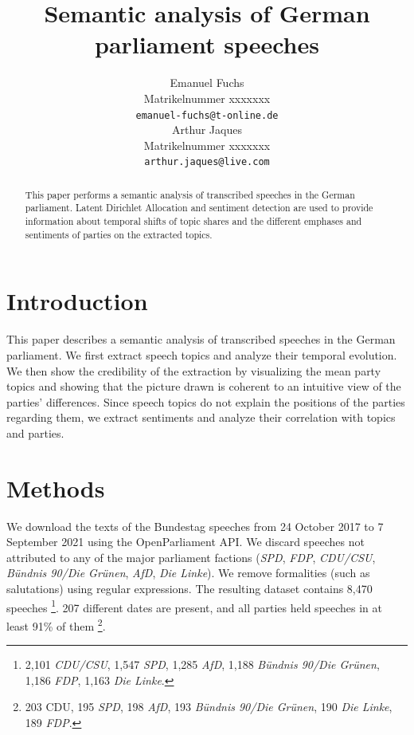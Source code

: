 \documentclass{article}
\title{Semantic analysis of German parliament speeches}
\author{%
  Emanuel Fuchs\\
  Matrikelnummer xxxxxxx\\
  \texttt{emanuel-fuchs@t-online.de} \\
  \And
  Arthur Jaques\\
  Matrikelnummer xxxxxxx\\
  \texttt{arthur.jaques@live.com} \\
}
\begin{document}
\maketitle


\begin{abstract}
  This paper performs a semantic analysis of transcribed speeches in the German parliament.
  Latent Dirichlet Allocation and sentiment detection are used to provide information about temporal shifts of topic shares and the different emphases and sentiments of parties on the extracted topics. 
\end{abstract}


\section{Introduction}
This paper describes a semantic analysis of transcribed speeches in the German parliament. 
We first extract speech topics and analyze their temporal evolution.
We then show the credibility of the extraction by visualizing the mean party topics and showing that the picture drawn is coherent to an intuitive view of the parties' differences.
Since speech topics do not explain the positions of the parties regarding them, we extract sentiments and analyze their correlation with topics and parties.


\section{Methods}
We download the texts of the Bundestag speeches from 24 October 2017 to 7 September 2021 using the OpenParliament \cite{OpenParliamentTV} API.
We discard speeches not attributed to any of the major parliament factions (\textit{SPD}, \textit{FDP}, \textit{CDU/CSU}, \textit{Bündnis 90/Die Grünen}, \textit{AfD}, \textit{Die Linke}).
We remove formalities (such as salutations) using regular expressions.
The resulting dataset contains 8,470 speeches
\footnote{2,101 \textit{CDU/CSU}, 1,547 \textit{SPD}, 1,285 \textit{AfD}, 1,188 \textit{Bündnis 90/Die Grünen}, 1,186 \textit{FDP}, 1,163 \textit{Die Linke}.}.
207 different dates are present, and all parties held speeches in at least 91\% of them
\footnote{203 CDU, 195 \textit{SPD}, 198 \textit{AfD}, 193 \textit{Bündnis 90/Die Grünen}, 190 \textit{Die Linke}, 189 \textit{FDP}.}.
\end{document}

